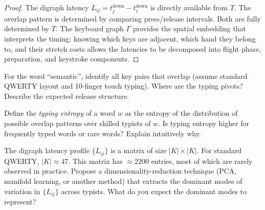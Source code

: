 \begin{proof}
  The digraph latency $L_{ij} = t_j^\text{down} - t_i^\text{down}$ is
  directly available from $T$. The overlap pattern is determined by
  comparing press/release intervals. Both are fully determined by $T$.
  The keyboard graph $\Gamma$ provides the spatial embedding that
  interprets the timing: knowing which keys are adjacent, which hand
  they belong to, and their stretch costs allows the latencies to be
  decomposed into flight phase, preparation, and keystroke components.
\end{proof}

\begin{exercise}
  For the word ``semantic'', identify all key pairs that overlap
  (assume standard QWERTY layout and 10-finger touch typing).
  Where are the typing pivots? Describe the expected release structure.
\end{exercise}

\begin{exercise}
  Define the \emph{typing entropy} of a word $w$ as the entropy of
  the distribution of possible overlap patterns over skilled typists
  of $w$. Is typing entropy higher for frequently typed words
  or rare words? Explain intuitively why.
\end{exercise}

\begin{exercise}[title={Research}]
  The digraph latency profile $\{L_{ij}\}$ is a matrix of size
  $|K| \times |K|$. For standard QWERTY, $|K| \approx 47$.
  This matrix has $\approx 2200$ entries, most of which are rarely
  observed in practice. Propose a dimensionality-reduction technique
  (PCA, manifold learning, or another method) that extracts the
  dominant modes of variation in $\{L_{ij}\}$ across typists.
  What do you expect the dominant modes to represent?
\end{exercise}

